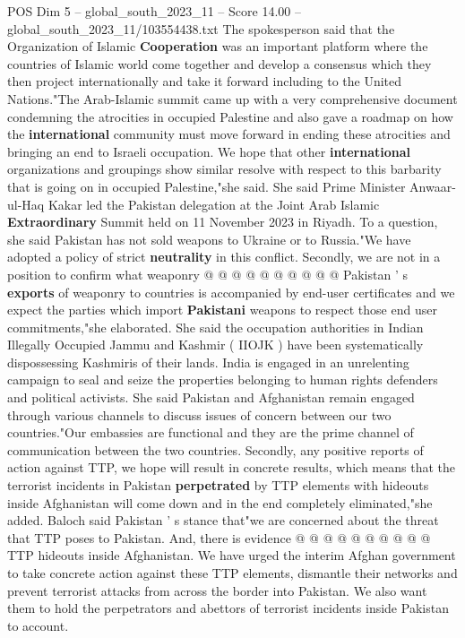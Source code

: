 \begin{textsample}{POS Dim 5 – global\_south\_2023\_11 – Score 14.00 – global\_south\_2023\_11/103554438.txt}
The spokesperson said that the Organization of Islamic \textbf{Cooperation} was an important platform where the countries of Islamic world come together and develop a consensus which they then project internationally and take it forward including to the United Nations."The Arab-Islamic summit came up with a very comprehensive document condemning the atrocities in occupied Palestine and also gave a roadmap on how the \textbf{international} community must move forward in ending these atrocities and bringing an end to Israeli occupation.
We hope that other \textbf{international} organizations and groupings show similar resolve with respect to this barbarity that is going on in occupied Palestine,"she said.
She said Prime Minister Anwaar- ul-Haq Kakar led the Pakistan delegation at the Joint Arab Islamic \textbf{Extraordinary} Summit held on 11 November 2023 in Riyadh.
To a question, she said Pakistan has not sold weapons to Ukraine or to Russia."We have adopted a policy of strict \textbf{neutrality} in this conflict.
Secondly, we are not in a position to confirm what weaponry @ @ @ @ @ @ @ @ @ @ Pakistan ' s \textbf{exports} of weaponry to countries is accompanied by end-user certificates and we expect the parties which import \textbf{Pakistani} weapons to respect those end user commitments,"she elaborated.
She said the occupation authorities in Indian Illegally Occupied Jammu and Kashmir ( IIOJK ) have been systematically dispossessing Kashmiris of their lands.
India is engaged in an unrelenting campaign to seal and seize the properties belonging to human rights defenders and political activists.
She said Pakistan and Afghanistan remain engaged through various channels to discuss issues of concern between our two countries."Our embassies are functional and they are the prime channel of communication between the two countries.
Secondly, any positive reports of action against TTP, we hope will result in concrete results, which means that the terrorist incidents in Pakistan \textbf{perpetrated} by TTP elements with hideouts inside Afghanistan will come down and in the end completely eliminated,"she added.
Baloch said Pakistan ' s stance that"we are concerned about the threat that TTP poses to Pakistan.
And, there is evidence @ @ @ @ @ @ @ @ @ @ TTP hideouts inside Afghanistan.
We have urged the interim Afghan government to take concrete action against these TTP elements, dismantle their networks and prevent terrorist attacks from across the border into Pakistan.
We also want them to hold the perpetrators and abettors of terrorist incidents inside Pakistan to account.

\end{textsample}
